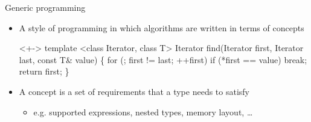 \begin{frame}[fragile]{Generic programming}

  \begin{itemize}[<+->]
  \item A style of programming in which \alert{algorithms} are written
    in terms of \alert{concepts}

  \begin{codeblock}<+->
template <class Iterator, class T>
Iterator
find(Iterator first, Iterator last, const T\& value)
\{
  for (; first \alert{!=} last; \alert{++}first)
    if (\alert{*}first \alert{==} value)
      break;
  return first;
\}\end{codeblock}

  \item A concept is a set of requirements that a type needs to satisfy
    \begin{itemize}[<.->]
    \item e.g. supported expressions, nested types, memory layout, \ldots
    \end{itemize}
  \end{itemize}


\end{frame}

